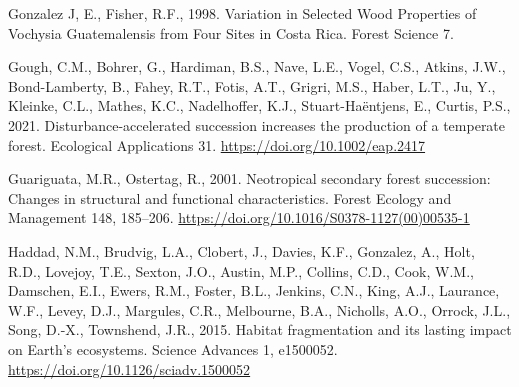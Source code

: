 \documentclass[
  12pt,
]{article}
\newlength{\cslhangindent}
\newlength{\cslentryspacingunit} %
\newenvironment{CSLReferences}[2] %
 {%
  \setlength{\parindent}{0pt}
  \ifodd #1
  \let\oldpar\par
  \def\par{\hangindent=\cslhangindent\oldpar}
  \fi
  \setlength{\parskip}{#2\cslentryspacingunit}
 }%
 {}
\begin{document}
\begin{CSLReferences}{1}{0}
\leavevmode{}%
Gonzalez J, E., Fisher, R.F., 1998. Variation in {Selected Wood Properties} of {Vochysia Guatemalensis} from {Four Sites} in {Costa Rica}. Forest Science 7.

\leavevmode{}%
Gough, C.M., Bohrer, G., Hardiman, B.S., Nave, L.E., Vogel, C.S., Atkins, J.W., Bond-Lamberty, B., Fahey, R.T., Fotis, A.T., Grigri, M.S., Haber, L.T., Ju, Y., Kleinke, C.L., Mathes, K.C., Nadelhoffer, K.J., Stuart-Haëntjens, E., Curtis, P.S., 2021. Disturbance-accelerated succession increases the production of a temperate forest. Ecological Applications 31. \url{https://doi.org/10.1002/eap.2417}

\leavevmode{}%
Guariguata, M.R., Ostertag, R., 2001. Neotropical secondary forest succession: {Changes} in structural and functional characteristics. Forest Ecology and Management 148, 185--206. \url{https://doi.org/10.1016/S0378-1127(00)00535-1}

\leavevmode{}%
Haddad, N.M., Brudvig, L.A., Clobert, J., Davies, K.F., Gonzalez, A., Holt, R.D., Lovejoy, T.E., Sexton, J.O., Austin, M.P., Collins, C.D., Cook, W.M., Damschen, E.I., Ewers, R.M., Foster, B.L., Jenkins, C.N., King, A.J., Laurance, W.F., Levey, D.J., Margules, C.R., Melbourne, B.A., Nicholls, A.O., Orrock, J.L., Song, D.-X., Townshend, J.R., 2015. Habitat fragmentation and its lasting impact on {Earth}'s ecosystems. Science Advances 1, e1500052. \url{https://doi.org/10.1126/sciadv.1500052}


\end{CSLReferences}
\end{document}

